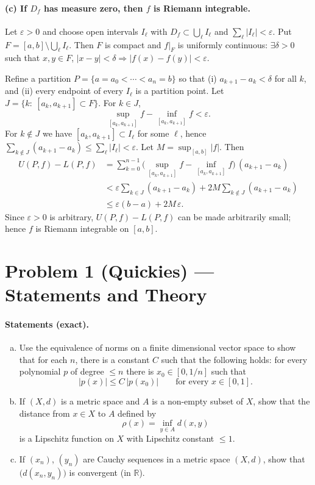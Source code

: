 \documentclass[12pt,a4paper]{article}
\theoremstyle{plain}
\theoremstyle{definition}
\theoremstyle{remark}
\theoremstyle{remark}
\begin{document}
\paragraph{(c) If $D_f$ has measure zero, then $f$ is Riemann integrable.}\mbox{}\par
Let $\varepsilon>0$ and choose open intervals $I_\ell$ with
$D_f\subset\bigcup_\ell I_\ell$ and $\sum_\ell |I_\ell|<\varepsilon$.
Put $F=[a,b]\setminus\bigcup_\ell I_\ell$.
Then $F$ is compact and $f|_F$ is uniformly continuous:
$\exists\delta>0$ such that $x,y\in F$, $|x-y|<\delta\Rightarrow |f(x)-f(y)|<\varepsilon$.

Refine a partition $P=\{a=a_0<\cdots<a_n=b\}$ so that
(i) $a_{k+1}-a_k<\delta$ for all $k$, and
(ii) every endpoint of every $I_\ell$ is a partition point.
Let $J=\{k:\ [a_k,a_{k+1}]\subset F\}$.
For $k\in J$,
\[
\sup_{[a_k,a_{k+1}]} f - \inf_{[a_k,a_{k+1}]} f < \varepsilon.
\]
For $k\notin J$ we have $[a_k,a_{k+1}]\subset I_\ell$ for some $\ell$, hence
$\sum_{k\notin J}(a_{k+1}-a_k)\le \sum_\ell |I_\ell|<\varepsilon$.
Let $M=\sup_{[a,b]}|f|$. Then
\[
\begin{aligned}
	U(P,f)-L(P,f)
	&=\sum_{k=0}^{n-1}\big(\sup_{[a_k,a_{k+1}]} f-\inf_{[a_k,a_{k+1}]} f\big)\,(a_{k+1}-a_k)\\
	&< \varepsilon\sum_{k\in J}(a_{k+1}-a_k)+2M\sum_{k\notin J}(a_{k+1}-a_k)\\
	&\le \varepsilon(b-a)+2M\,\varepsilon.
\end{aligned}
\]
Since $\varepsilon>0$ is arbitrary, $U(P,f)-L(P,f)$ can be made arbitrarily small; hence
$f$ is Riemann integrable on $[a,b]$.


\section*{Problem 1 (Quickies) — Statements and Theory}

\paragraph{Statements (exact).}
\begin{enumerate}[(a)]
	\item Use the equivalence of norms on a finite dimensional vector space to show that for each $n$, there is a constant $C$ such that the following holds: for every polynomial $p$ of degree $\le n$ there is $x_0 \in [0,1/n]$ such that
	\[
	|p(x)| \le C\,|p(x_0)| \qquad \text{for every } x \in [0,1].
	\]
	\item If $(X,d)$ is a metric space and $A$ is a non-empty subset of $X$, show that the distance from $x\in X$ to $A$ defined by
	\[
	\rho(x)=\inf_{y\in A} d(x,y)
	\]
	is a Lipschitz function on $X$ with Lipschitz constant $\le 1$.
	\item If $(x_n)$, $(y_n)$ are Cauchy sequences in a metric space $(X,d)$, show that $\big(d(x_n,y_n)\big)$ is convergent (in $\mathbb{R}$).
\end{enumerate}
\end{document}
